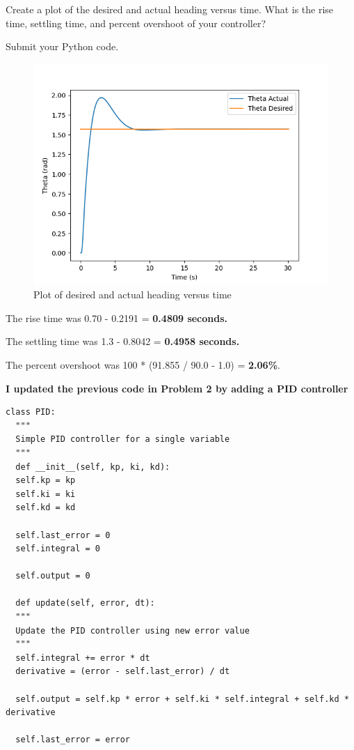 \documentclass{article}
\begin{document}
\bigskip
\noindent Create a plot of the desired and actual heading versus time. What is the rise time, settling time, and 
percent overshoot of your controller? 

\bigskip
\noindent Submit your Python code.

\begin{figure}[H]
  \centering
  \includegraphics[width=\textwidth]{question4.png}
  \caption*{Plot of desired and actual heading versus time}
\end{figure}

\noindent The rise time was 0.70 - 0.2191 = \textbf{0.4809 seconds.} 

\noindent The settling time was 1.3 - 0.8042 =  \textbf{0.4958 seconds.} 

\noindent The percent overshoot was 100 * (91.855 / 90.0 - 1.0) = \textbf{2.06\%}.

\bigskip
\noindent \textbf{I updated the previous code in Problem 2 by adding a PID controller}



\begin{verbatim}
class PID:
  """
  Simple PID controller for a single variable
  """
  def __init__(self, kp, ki, kd):
  self.kp = kp
  self.ki = ki
  self.kd = kd

  self.last_error = 0
  self.integral = 0

  self.output = 0

  def update(self, error, dt):
  """
  Update the PID controller using new error value
  """
  self.integral += error * dt
  derivative = (error - self.last_error) / dt

  self.output = self.kp * error + self.ki * self.integral + self.kd * derivative

  self.last_error = error
\end{verbatim}
\end{document}
